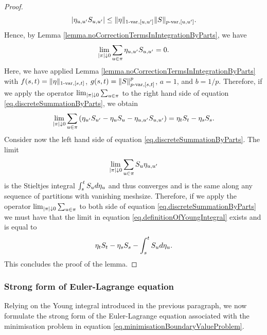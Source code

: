 \documentclass[10pt,a4paper]{article}
\begin{document}
\begin{appendices}
\begin{proof}
	\begin{equation*}
	\abs{\eta_{u,u\derivative}\fundamentalPrice_{u,u\derivative}}
	 \leq \pvarNormInterval[\eta]{1}{[u,u\derivative]} \pvarNormInterval[\fundamentalPrice]{p}{[u,u\derivative]}.
	\end{equation*}
	Hence, by Lemma \ref{lemma.noCorrectionTermsInIntegrationByParts}, we have
	\begin{equation*}
	\lim_{\abs{\partition}\downarrow 0 }\sum_{u\in\partition} \eta_{u,u\derivative}\fundamentalPrice_{u,u\derivative} = 0. 
	\end{equation*}
	Here, we have applied Lemma \ref{lemma.noCorrectionTermsInIntegrationByParts} with $f(s,t) = \pvarNormInterval[\eta]{1}{[s,t]}$, $g(s,t) = \pvarNormInterval[\fundamentalPrice]{p}{[s,t]}^{p}$, $a=1$, and $b=1/p$. 
	Therefore, if we apply the operator $\lim_{\abs{\partition}\downarrow 0 }\sum_{u\in\partition}$ to the right hand side of equation \eqref{eq.discreteSummationByParts}, we obtain 
	\begin{equation*} \label{eq.meshsizeShrinkingOnRHSofIntegrationByParts}
	\lim_{\abs{\partition}\downarrow 0 }\sum_{u\in\partition} \left(
	 \eta_{u\derivative}\fundamentalPrice_{u\derivative} - \eta_{u}\fundamentalPrice_{u} - \eta_{u,u\derivative} \fundamentalPrice_{u,u\derivative}
	 \right) = \eta_t\fundamentalPrice_t - \eta_s \fundamentalPrice_s. 
	\end{equation*}
	Consider now the left hand side of  equation \eqref{eq.discreteSummationByParts}. The limit 
	\begin{equation*}
	\lim_{\abs{\partition}\downarrow 0 } \sum_{u\in\partition} \fundamentalPrice_{u}\eta_{u,u\derivative}
	\end{equation*}
	is the  Stieltjes integral $\int_{s}^{t} \fundamentalPrice_u d\eta_u  $ and thus converges and is the same along any sequence of partitions with vanishing meshsize. Therefore, if we apply the operator $\lim_{\abs{\partition}\downarrow 0 }\sum_{u\in\partition}$ to both side of equation \eqref{eq.discreteSummationByParts} we must have that the limit in equation \eqref{eq.definitionOfYoungIntegral} exists and is equal to 
	\begin{equation*}
	\eta_t\fundamentalPrice_t - \eta_s \fundamentalPrice_s - \int_{s}^{t} \fundamentalPrice_u d\eta_u .
	\end{equation*}
	This concludes the proof of the lemma. 
\end{proof}

\subsubsection*{Strong form of Euler-Lagrange equation}
Relying on the Young integral introduced in the previous  paragraph, we now formulate the strong form of the Euler-Lagrange equation associated with the minimisation problem in equation \eqref{eq.minimisationBoundaryValueProblem}. 


\end{appendices}
\end{document}

